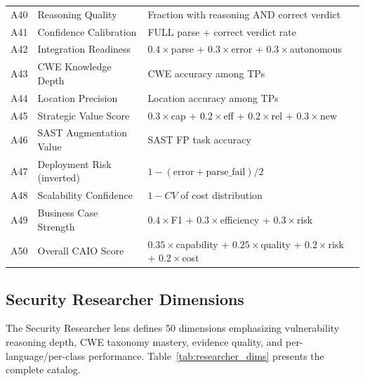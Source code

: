 \documentclass[10pt,twocolumn]{article}
\begin{document}
\begin{table}[t]
\begin{tabular}{@{}r l p{7.5cm}@{}}
A40 & Reasoning Quality                   & Fraction with reasoning AND correct verdict \\
A41 & Confidence Calibration              & FULL parse + correct verdict rate \\
A42 & Integration Readiness               & $0.4{\times}$parse + $0.3{\times}$error + $0.3{\times}$autonomous \\
A43 & CWE Knowledge Depth                 & CWE accuracy among TPs \\
A44 & Location Precision                  & Location accuracy among TPs \\
A45 & Strategic Value Score               & $0.3{\times}$cap + $0.2{\times}$eff + $0.2{\times}$rel + $0.3{\times}$new \\
A46 & SAST Augmentation Value             & SAST FP task accuracy \\
A47 & Deployment Risk (inverted)          & $1 - (\text{error} + \text{parse\_fail}) / 2$ \\
A48 & Scalability Confidence              & $1 - CV$ of cost distribution \\
A49 & Business Case Strength              & $0.4{\times}$F1 + $0.3{\times}$efficiency + $0.3{\times}$risk \\
A50 & Overall CAIO Score                  & $0.35{\times}$capability + $0.25{\times}$quality + $0.2{\times}$risk + $0.2{\times}$cost \\
\bottomrule
\end{tabular}
\end{table}

\subsection{Security Researcher Dimensions}
\label{sec:researcher_dims}

The Security Researcher lens defines 50 dimensions emphasizing vulnerability reasoning depth, CWE taxonomy mastery, evidence quality, and per-language/per-class performance. Table~\ref{tab:researcher_dims} presents the complete catalog.
\end{document}
